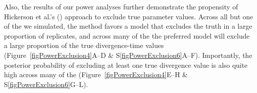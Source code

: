 


Also, the results of our power analyses further demonstrate the propensity of
Hickerson et al.'s (\citeyear{Hickerson2013}) approach to exclude true
parameter values.
Across all but one of the  we simulated, the method favors a model
that excludes the truth in a large proportion of replicates, and across many of
the  the preferred model will exclude a large proportion of the true
divergence-time values (Figure~\ref{figPowerExclusion4}A--D \&
S\ref{figPowerExclusion6}A--F).
Importantly, the posterior probability of excluding at least one true
divergence value is also quite high across many of the 
(Figure~\ref{figPowerExclusion4}E--H \& S\ref{figPowerExclusion6}G--L).



